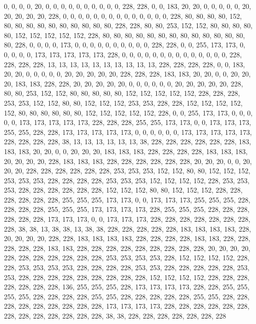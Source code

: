 {	0,   0,   0,   0,   20,  0,   0,   0,   0,   0,   0,   0,   0,   0,   0,   228, 228, 0,   0,   183, 20,  20,  0,   0,   0,   0,   0,   20,  20,  20,  20,  20,  228, 0,   0,   0,   0,   0,   0,   0,   0,   0,   0,   0,   0,   0,   0,   228, 80,  80,  80,  80,  152, 80,  80,  80,  80,  80,  80,  80,  80,  80,  80,  228, 228, 80,  80,  253, 152, 152, 80,  80,  80,  80,  80,  152, 152, 152, 152, 152, 228, 80,  80,  80,  80,  80,  80,  80,  80,  80,  80,  80,  80,  80,  80,  228, 0,   0,   0,   0,   173, 0,   0,   0,   0,   0,   0,   0,   0,   0,   0,   228, 228, 0,   0,   255, 173, 173, 0,   0,   0,   0,   0,   173, 173, 173, 173, 173, 228, 0,   0,   0,   0,   0,   0,   0,   0,   0,   0,   0,   0,   0,   0,   228, 228, 228, 228, 13,  13,  13,  13,  13,  13,  13,  13,  13,  13,  228, 228, 228, 
	228, 0,   0,   183, 20,  20,  0,   0,   0,   0,   0,   20,  20,  20,  20,  20,  228, 228, 228, 183, 183, 20,  20,  0,   0,   20,  20,  20,  183, 183, 228, 228, 20,  20,  20,  20,  20,  0,   0,   0,   0,   0,   0,   20,  20,  20,  20,  20,  228, 80,  80,  253, 152, 152, 80,  80,  80,  80,  80,  152, 152, 152, 152, 152, 228, 228, 228, 253, 253, 152, 152, 80,  80,  152, 152, 152, 253, 253, 228, 228, 152, 152, 152, 152, 152, 80,  80,  80,  80,  80,  80,  152, 152, 152, 152, 152, 228, 0,   0,   255, 173, 173, 0,   0,   0,   0,   0,   173, 173, 173, 173, 173, 228, 228, 228, 255, 255, 173, 173, 0,   0,   173, 173, 173, 255, 255, 228, 228, 173, 173, 173, 173, 173, 0,   0,   0,   0,   0,   0,   173, 173, 173, 173, 173, 228, 228, 228, 228, 38,  13,  13,  13,  13,  13,  13,  38,  228, 228, 228, 228, 
	228, 228, 183, 183, 183, 20,  20,  0,   0,   20,  20,  20,  183, 183, 183, 228, 228, 228, 228, 183, 183, 183, 20,  20,  20,  20,  228, 183, 183, 183, 228, 228, 228, 228, 228, 228, 20,  20,  20,  0,   0,   20,  20,  20,  228, 228, 228, 228, 228, 228, 253, 253, 253, 152, 152, 80,  80,  152, 152, 152, 253, 253, 253, 228, 228, 228, 228, 253, 253, 253, 152, 152, 152, 152, 228, 253, 253, 253, 228, 228, 228, 228, 228, 228, 152, 152, 152, 80,  80,  152, 152, 152, 228, 228, 228, 228, 228, 228, 255, 255, 255, 173, 173, 0,   0,   173, 173, 173, 255, 255, 255, 228, 228, 228, 228, 255, 255, 255, 173, 173, 173, 173, 228, 255, 255, 255, 228, 228, 228, 228, 228, 228, 173, 173, 173, 0,   0,   173, 173, 173, 228, 228, 228, 228, 228, 228, 228, 228, 38,  38,  13,  38,  38,  13,  38,  38,  228, 228, 228, 228, 
	228, 183, 183, 183, 183, 228, 20,  20,  20,  20,  228, 228, 183, 183, 183, 183, 228, 228, 228, 228, 183, 183, 228, 228, 228, 228, 228, 183, 183, 228, 228, 228, 228, 228, 228, 228, 228, 228, 20,  20,  20,  20,  228, 228, 228, 228, 228, 228, 228, 253, 253, 253, 253, 228, 152, 152, 152, 152, 228, 228, 253, 253, 253, 253, 228, 228, 228, 228, 253, 253, 228, 228, 228, 228, 228, 253, 253, 228, 228, 228, 228, 228, 228, 228, 228, 228, 152, 152, 152, 152, 228, 228, 228, 228, 228, 228, 228, 136, 255, 255, 255, 228, 173, 173, 173, 173, 228, 228, 255, 255, 255, 255, 228, 228, 228, 228, 255, 255, 228, 228, 228, 228, 228, 255, 255, 228, 228, 228, 228, 228, 228, 228, 228, 228, 173, 173, 173, 173, 228, 228, 228, 228, 228, 228, 228, 228, 228, 228, 228, 228, 228, 38,  38,  228, 228, 228, 228, 228, 228, 228 
}

